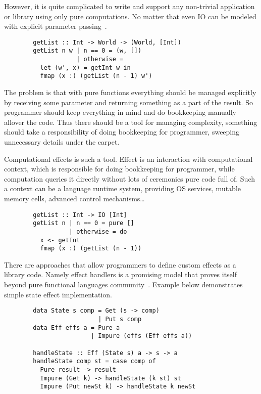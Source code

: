 \documentclass[conference]{IEEEtran}
\begin{document}
    However, it is quite complicated to write and support any non-trivial application or library using only pure computations.
    No matter that even IO can be modeled with explicit parameter passing~\cite{io}.

    \begin{verbatim}
        getList :: Int -> World -> (World, [Int])
        getList n w | n == 0 = (w, [])
                    | otherwise =
          let (w', x) = getInt w in
          fmap (x :) (getList (n - 1) w')
    \end{verbatim}

    The problem is that with pure functions everything should be managed explicitly by receiving some parameter and returning something as a part of the result.
    So programmer should keep everything in mind and do bookkeeping manually allover the code.
    Thus there should be a tool for managing complexity, something should take a responsibility of doing bookkeeping for programmer, sweeping unnecessary details under the carpet.

    Computational effects is such a tool.
    Effect is an interaction with computational context, which is responsible for doing bookkeeping for programmer, while computation queries it directly without lots of ceremonies pure code full of.
    Such a context can be a language runtime system, providing OS services, mutable memory cells, advanced control mechanisms\ldots

    \begin{verbatim}
        getList :: Int -> IO [Int]
        getList n | n == 0 = pure []
                  | otherwise = do
          x <- getInt
          fmap (x :) (getList (n - 1))
    \end{verbatim}

    There are approaches that allow programmers to define custom effects as a library code.
    Namely effect handlers is a promising model that proves itself beyond pure functional languages community~\cite{eh-mainstream}.
    Example below demonstrates simple state effect implementation.

    \begin{verbatim}
        data State s comp = Get (s -> comp)
                          | Put s comp
        data Eff effs a = Pure a
                        | Impure (effs (Eff effs a))

        handleState :: Eff (State s) a -> s -> a
        handleState comp st = case comp of
          Pure result -> result
          Impure (Get k) -> handleState (k st) st
          Impure (Put newSt k) -> handleState k newSt
    \end{verbatim}
\end{document}
